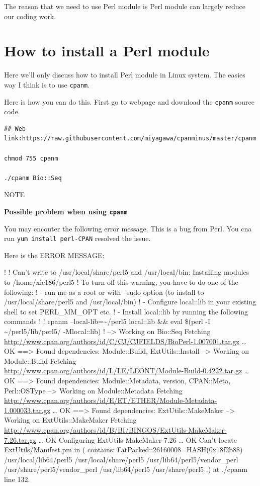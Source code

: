 \documentclass[]{book}
\theoremstyle{definition}
\theoremstyle{definition}
\theoremstyle{definition}
\theoremstyle{remark}
\let\BeginKnitrBlock\begin \let\EndKnitrBlock\end
\begin{document}
The reason that we need to use Perl module is Perl module can largely
reduce our coding work.

\section{How to install a Perl
module}\label{how-to-install-a-perl-module}

Here we'll only discuss how to install Perl module in Linux system. The
easies way I think is to use \texttt{cpanm}.

Here is how you can do this. First go to webpage and download the
\texttt{cpanm} source code.

\begin{verbatim}
## Web link:https://raw.githubusercontent.com/miyagawa/cpanminus/master/cpanm

chmod 755 cpanm

./cpanm Bio::Seq
\end{verbatim}

NOTE

\BeginKnitrBlock{rmdtip}
\textbf{Possible problem when using \texttt{cpanm}}

You may encouter the following error message. This is a bug from Perl.
You cna run \texttt{yum\ install\ perl-CPAN} resolved the issue.

Here is the ERROR MESSAGE:

! ! Can't write to /usr/local/share/perl5 and /usr/local/bin: Installing
modules to /home/xie186/perl5 ! To turn off this warning, you have to do
one of the following: ! - run me as a root or with --sudo option (to
install to /usr/local/share/perl5 and /usr/local/bin) ! - Configure
local::lib in your existing shell to set PERL\_MM\_OPT etc. ! - Install
local::lib by running the following commands ! ! cpanm
--local-lib=\textasciitilde{}/perl5 local::lib \&\& eval \$(perl -I
\textasciitilde{}/perl5/lib/perl5/ -Mlocal::lib) ! --\textgreater{}
Working on Bio::Seq Fetching
\url{http://www.cpan.org/authors/id/C/CJ/CJFIELDS/BioPerl-1.007001.tar.gz}
\ldots{} OK ==\textgreater{} Found dependencies: Module::Build,
ExtUtils::Install --\textgreater{} Working on Module::Build Fetching
\url{http://www.cpan.org/authors/id/L/LE/LEONT/Module-Build-0.4222.tar.gz}
\ldots{} OK ==\textgreater{} Found dependencies: Module::Metadata,
version, CPAN::Meta, Perl::OSType --\textgreater{} Working on
Module::Metadata Fetching
\url{http://www.cpan.org/authors/id/E/ET/ETHER/Module-Metadata-1.000033.tar.gz}
\ldots{} OK ==\textgreater{} Found dependencies: ExtUtils::MakeMaker
--\textgreater{} Working on ExtUtils::MakeMaker Fetching
\url{http://www.cpan.org/authors/id/B/BI/BINGOS/ExtUtils-MakeMaker-7.26.tar.gz}
\ldots{} OK Configuring ExtUtils-MakeMaker-7.26 \ldots{} OK Can't locate
ExtUtils/Manifest.pm in \citet{INC} (\citet{INC} contains:
FatPacked::26160008=HASH(0x18f2b88) /usr/local/lib64/perl5
/usr/local/share/perl5 /usr/lib64/perl5/vendor\_perl
/usr/share/perl5/vendor\_perl /usr/lib64/perl5 /usr/share/perl5 .) at
./cpanm line 132.
\EndKnitrBlock{rmdtip}
\end{document}
